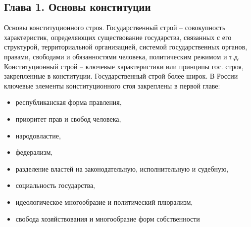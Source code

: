 \documentclass[a4paper, 12pt]{article}
\begin{document}
\subsection{Глава 1. Основы конституции}
Основы конституционного строя. Государственный строй -- совокупность характеристик, определяющих существование государства, связанных с его структурой, территориальной организацией, системой государственных органов, правами, свободами и обязанностями человека, политическим режимом и т.д. Конституционный строй -- ключевые характеристики или принципы гос. строя, закрепленные в конституции. Государственный строй более широк. В России ключевые элементы конституционного стоя закреплены в первой главе: 
\begin{itemize}
\item республиканская форма правления, 
\item приоритет прав и свобод человека, 
\item народовластие, 
\item федерализм, 
\item разделение властей на законодательную, исполнительную и судебную, 
\item социальность государства, 
\item идеологическое многообразие и политический плюрализм, 
\item свобода хозяйствования и многообразие форм собственности
\end{itemize}
\end{document}
